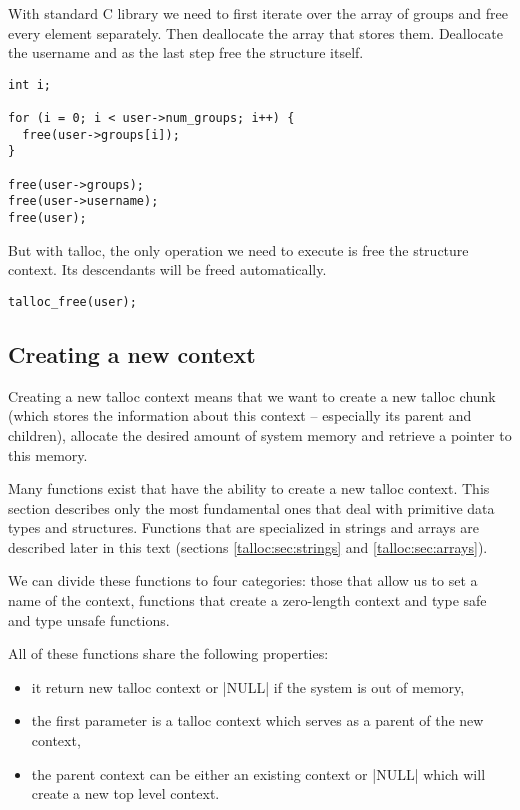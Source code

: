 With standard C library we need to first iterate over the array of groups and
free every element separately. Then deallocate the array that stores them.
Deallocate the username and as the last step free the structure itself.

\begin{lstlisting}[caption={Freeing struct user -- C standard library},
                   label={lst:free-struct-user-c}]
int i;

for (i = 0; i < user->num_groups; i++) {
  free(user->groups[i]);
}

free(user->groups);
free(user->username);
free(user);
\end{lstlisting}

\noindent
But with talloc, the only operation we need to execute is free the structure
context. Its descendants will be freed automatically.

\begin{lstlisting}[caption={Freeing struct user -- talloc library},
                   label={lst:free-struct-user-talloc}]
talloc_free(user);
\end{lstlisting}

\subsection{Creating a new context}
\label{talloc:subsec:new-context}

Creating a new talloc context means that we want to create a new talloc chunk
(which stores the information about this context -- especially its parent and
children), allocate the desired amount of system memory and retrieve a pointer
to this memory.

Many functions exist that have the ability to create a new talloc context. This
section describes only the most fundamental ones that deal with primitive data
types and structures. Functions that are specialized in strings and arrays are
described later in this text (sections \ref{talloc:sec:strings} and
\ref{talloc:sec:arrays}).

We can divide these functions to four categories: those that allow us to set a
name of the context, functions that create a zero-length context and type safe
and type unsafe functions.

All of these functions share the following properties:
\begin{itemize}
  \item it return new talloc context or |NULL| if the system is out of memory,
  \item the first parameter is a talloc context which serves as a parent of
  the new context,
  \item the parent context can be either an existing context or |NULL| which
  will create a new top level context.
\end{itemize}

